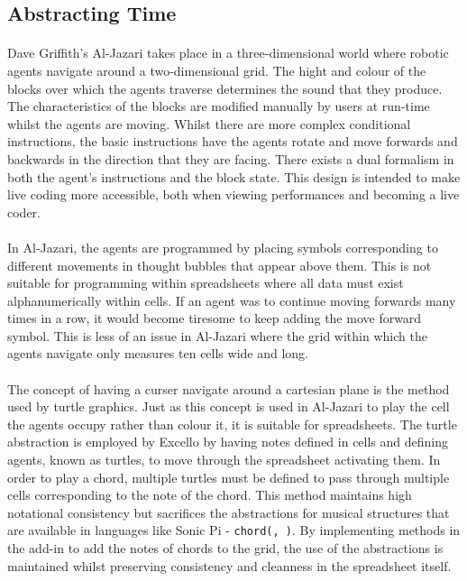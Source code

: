 \subsection{Abstracting Time}

\paragraph{} Dave Griffith's Al-Jazari \cite{mclean:visualisation} takes place in a three-dimensional world where robotic agents navigate around a two-dimensional grid. The hight and colour of the blocks over which the agents traverse determines the sound that they produce. The characteristics of the blocks are modified manually by users at run-time whilst the agents are moving. Whilst there are more complex conditional instructions, the basic instructions have the agents rotate and move forwards and backwards in the direction that they are facing. There exists a dual formalism in both the agent's instructions and the block state. This design is intended to make live coding more accessible, both when viewing performances and becoming a live coder.

\paragraph{} In Al-Jazari, the agents are programmed by placing symbols corresponding to different movements in thought bubbles that appear above them. This is not suitable for programming within spreadsheets where all data must exist alphanumerically within cells. If an agent was to continue moving forwards many times in a row, it would become tiresome to keep adding the move forward symbol. This is less of an issue in Al-Jazari where the grid within which the agents navigate only measures ten cells wide and long.

\paragraph{} The concept of having a curser navigate around a cartesian plane is the method used by turtle graphics. Just as this concept is used in Al-Jazari to play the cell the agents occupy rather than colour it, it is suitable for spreadsheets. The turtle abstraction is employed by Excello by having notes defined in cells and defining agents, known as turtles, to move through the spreadsheet activating them. In order to play a chord, multiple turtles must be defined to pass through multiple cells corresponding to the note of the chord. This method maintains high notational consistency but sacrifices the abstractions for musical structures that are available in languages like Sonic Pi - \texttt{chord(, )}. By implementing methods in the add-in to add the notes of chords to the grid, the use of the abstractions is maintained whilst preserving consistency and cleanness in the spreadsheet itself.


